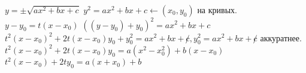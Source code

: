\documentclass[12pt]{article}
\begin{document}
    $y = \pm\sqrt{ax^2 + bx + c}$ \newline
    $y^2 = ax^2 + bx + c \leftarrow (x_0, y_0)$ на кривых. \newline
    $y - y_0 = t(x - x_0)$ \newline
    $((y - y_0) + y_0)^2 = ax^2 + bx + c$ \newline
    $t^2(x - x_0)^2 + 2t(x - x_0)y_0 + y_0^2 = ax^2 + bx + \not c, y_0^2 = ax^2 + bx + \not c$ аккуратнее. \newline
    $t^2(x - x_0)^2 + 2t(x - x_0)y_0 = a(x^2 - x_0^2) + b(x - x_0)$ \newline
    $t^2(x - x_0) + 2ty_0 = a(x + x_0) + b$ \newline
\end{document}
